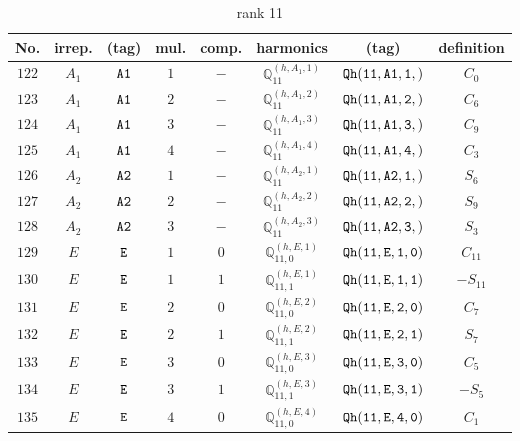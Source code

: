 \documentclass[fleqn,8pt]{jsarticle}
\begin{document}
\begin{table}[ht!]
\begin{center}
\caption{rank 11}
\renewcommand{\arraystretch}{1.3}
\begin{tabular}{cccccccc} \hline \hline
No. & irrep. & (tag) & mul. & comp. & harmonics & (tag) & definition \\ \hline
$ 122 $ & $ A_{1} $ & $ {\tt A1} $ & $ 1 $ & $ - $ & $ \mathbb{Q}_{11}^{(h,A_{1},1)} $ & $ {\tt Qh(11,A1,1,)} $ & $ C_{0} $ \\
$ 123 $ & $ A_{1} $ & $ {\tt A1} $ & $ 2 $ & $ - $ & $ \mathbb{Q}_{11}^{(h,A_{1},2)} $ & $ {\tt Qh(11,A1,2,)} $ & $ C_{6} $ \\
$ 124 $ & $ A_{1} $ & $ {\tt A1} $ & $ 3 $ & $ - $ & $ \mathbb{Q}_{11}^{(h,A_{1},3)} $ & $ {\tt Qh(11,A1,3,)} $ & $ C_{9} $ \\
$ 125 $ & $ A_{1} $ & $ {\tt A1} $ & $ 4 $ & $ - $ & $ \mathbb{Q}_{11}^{(h,A_{1},4)} $ & $ {\tt Qh(11,A1,4,)} $ & $ C_{3} $ \\
$ 126 $ & $ A_{2} $ & $ {\tt A2} $ & $ 1 $ & $ - $ & $ \mathbb{Q}_{11}^{(h,A_{2},1)} $ & $ {\tt Qh(11,A2,1,)} $ & $ S_{6} $ \\
$ 127 $ & $ A_{2} $ & $ {\tt A2} $ & $ 2 $ & $ - $ & $ \mathbb{Q}_{11}^{(h,A_{2},2)} $ & $ {\tt Qh(11,A2,2,)} $ & $ S_{9} $ \\
$ 128 $ & $ A_{2} $ & $ {\tt A2} $ & $ 3 $ & $ - $ & $ \mathbb{Q}_{11}^{(h,A_{2},3)} $ & $ {\tt Qh(11,A2,3,)} $ & $ S_{3} $ \\
$ 129 $ & $ E $ & $ {\tt E} $ & $ 1 $ & $ 0 $ & $ \mathbb{Q}_{11,0}^{(h,E,1)} $ & $ {\tt Qh(11,E,1,0)} $ & $ C_{11} $ \\
$ 130 $ & $ E $ & $ {\tt E} $ & $ 1 $ & $ 1 $ & $ \mathbb{Q}_{11,1}^{(h,E,1)} $ & $ {\tt Qh(11,E,1,1)} $ & $ - S_{11} $ \\
$ 131 $ & $ E $ & $ {\tt E} $ & $ 2 $ & $ 0 $ & $ \mathbb{Q}_{11,0}^{(h,E,2)} $ & $ {\tt Qh(11,E,2,0)} $ & $ C_{7} $ \\
$ 132 $ & $ E $ & $ {\tt E} $ & $ 2 $ & $ 1 $ & $ \mathbb{Q}_{11,1}^{(h,E,2)} $ & $ {\tt Qh(11,E,2,1)} $ & $ S_{7} $ \\
$ 133 $ & $ E $ & $ {\tt E} $ & $ 3 $ & $ 0 $ & $ \mathbb{Q}_{11,0}^{(h,E,3)} $ & $ {\tt Qh(11,E,3,0)} $ & $ C_{5} $ \\
$ 134 $ & $ E $ & $ {\tt E} $ & $ 3 $ & $ 1 $ & $ \mathbb{Q}_{11,1}^{(h,E,3)} $ & $ {\tt Qh(11,E,3,1)} $ & $ - S_{5} $ \\
$ 135 $ & $ E $ & $ {\tt E} $ & $ 4 $ & $ 0 $ & $ \mathbb{Q}_{11,0}^{(h,E,4)} $ & $ {\tt Qh(11,E,4,0)} $ & $ C_{1} $ \\

\end{tabular}
\end{center}
\end{table}
\end{document}
